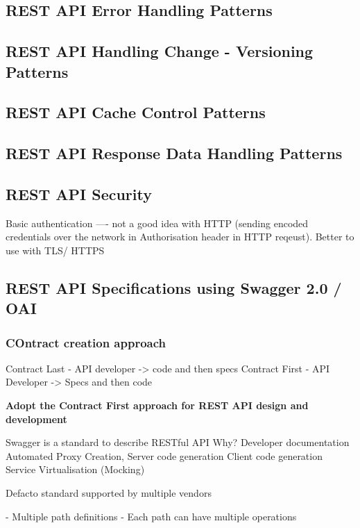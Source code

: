 \documentclass[a4paper, 11pt]{book}
\begin{document}
    \subsection{REST API Error Handling Patterns}

    \subsection{REST API Handling Change - Versioning Patterns}

    \subsection{REST API Cache Control Patterns}

    \subsection{REST API Response Data Handling Patterns}

    \subsection{REST API Security}

    Basic authentication ---- not a good idea with HTTP (sending encoded credentials over the network in Authorisation header in HTTP reqeust). Better to use with TLS/ HTTPS

    \subsection{REST API Specifications using Swagger 2.0 / OAI}

    \subsubsection{COntract creation approach}
    Contract Last - API developer -> code and then specs
    Contract First - API Developer -> Specs and then code

    \textbf{Adopt the Contract First approach for REST API design and development}

    Swagger is a standard to describe RESTful API
    Why?
    Developer documentation
    Automated Proxy Creation, Server code generation
    Client code generation
    Service Virtualisation (Mocking)

    Defacto standard supported by multiple vendors

    - Multiple path definitions
    - Each path can have multiple operations
\end{document}
